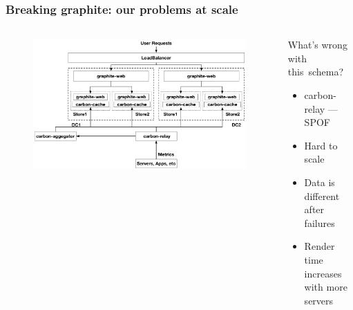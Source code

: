 \documentclass[aspectratio=43, unicode, notheorems, xcolor={dvipsnames}]{beamer}
\begin{document}
\begin{frame}
	\frametitle{Breaking graphite: our problems at scale}
	\begin{columns}
		\begin{column}{0.5\linewidth}
			\begin{figure}[h]
				\includegraphics[width=1.0\columnwidth]{graphite-oss}
			\end{figure}
		\end{column}
		\begin{column}{0.5\linewidth}
			\Large{
			What's wrong with this~schema?
			\begin{itemize}
				\item carbon-relay --- SPOF
				\item Hard to scale
				\item Data is different after failures
				\item Render time increases with more servers
			\end{itemize}
			}
		\end{column}
	\end{columns}
\end{frame}
\end{document}
